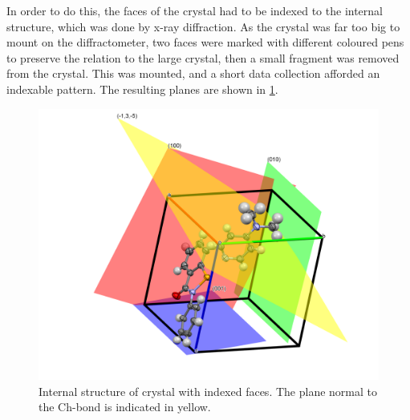 \begin{refsection}
In order to do this, the faces of the crystal had to be indexed to the internal structure, which was done by x-ray diffraction.
As the crystal was far too big to mount on the diffractometer, two faces were marked with different coloured pens to preserve the relation to the large crystal, then a small fragment was removed from the crystal.
This was mounted, and a short data collection afforded an indexable pattern.
The resulting planes are shown in \cref{fig:ebs-ph-dmap-index}.

\begin{figure}
  \centering
  \includegraphics[width=0.7\linewidth]{Figures/indices.png}
  \caption{Internal structure of crystal with indexed faces. The plane normal to the Ch-bond is indicated in yellow.}
  \label{fig:ebs-ph-dmap-index}
\end{figure}


\end{refsection}
